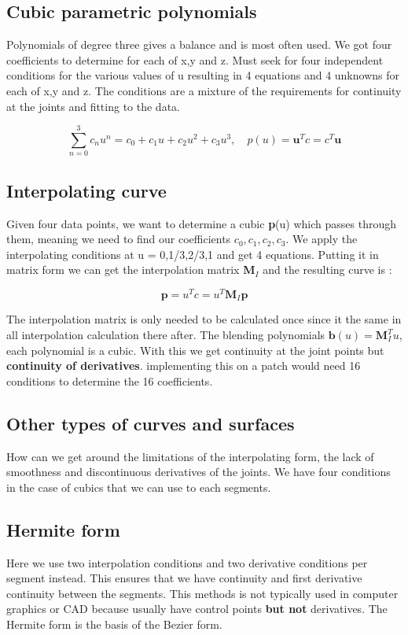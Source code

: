 	\subsection*{Cubic parametric polynomials}
	Polynomials of degree three gives a balance and is most often used. We got four coefficients to determine for each of x,y and z. Must seek for four independent conditions for the various values of u resulting in 4 equations and 4 unknowns for each of x,y and z. The conditions are a mixture of the requirements for continuity at the joints and fitting to the data.

	\begin{equation}
		\sum_{n=0}^{3} c_n u^{n} = c_0 + c_1u +c_2u^{2} + c_3 u^{3}, \quad p(u) = \textbf{u}^{T}c = c^{T} \textbf{u}
	\end{equation}

	\subsection*{Interpolating curve}
	Given four data points, we want to determine a cubic \textbf{p}(u) which passes through them, meaning we need to find our coefficients $c_0,c_1,c_2,c_3$. We apply the interpolating conditions at u = 0,1/3,2/3,1 and get 4 equations. Putting it in matrix form we can get the interpolation matrix \textbf{M}$_I$ and the resulting curve is :

		\begin{equation}
			\textbf{p} = u^{T}c = u^{T}\textbf{M}_I \textbf{p}
		\end{equation}

	The interpolation matrix is only needed to be calculated once since it the same in all interpolation calculation there after. The blending polynomials $\textbf{b}(u) = \textbf{M}_I^{T}u$, each polynomial is a cubic. With this we get continuity at the joint points but \textbf{continuity of derivatives}. 
	implementing this on a patch would need 16 conditions to determine the 16 coefficients. 


	\subsection*{Other types of curves and surfaces}
	How can we get around the limitations of the interpolating form, the lack of smoothness and discontinuous derivatives of the joints. We have four conditions in the case of cubics that we can use to each segments. 

	\subsection*{Hermite form}
	Here we use two interpolation conditions and two derivative conditions per segment instead. This ensures that we have continuity and first derivative continuity between the segments. This methods is not typically used in computer graphics or CAD because usually have control points \textbf{but not} derivatives. The Hermite form is the basis of the Bezier form.


